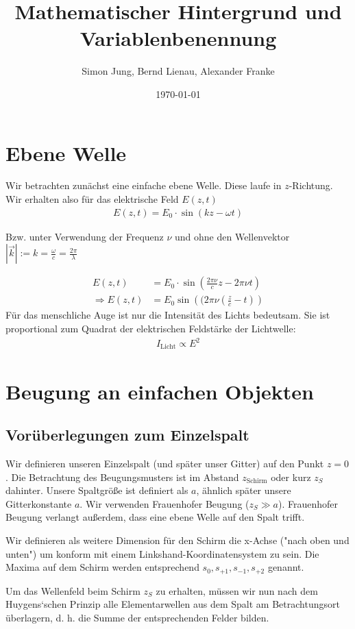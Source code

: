 \documentclass[a4paper]{article}
\title{Mathematischer Hintergrund und Variablenbenennung}
\author{Simon Jung, Bernd Lienau, Alexander Franke}
\date{\today}
\begin{document}
\maketitle
\tableofcontents
\section{Ebene Welle}
Wir betrachten zunächst eine einfache ebene Welle. Diese laufe in $z$-Richtung. Wir erhalten also für das elektrische Feld $E(z,t)$
\begin{align}
E(z,t) = E_0 \cdot \sin(k z-\omega t)
\end{align}

Bzw. unter Verwendung der Frequenz $\nu$ und ohne den Wellenvektor $|\vec{k}| := k = \frac{\omega}{c} = \frac{2\pi}{\lambda}$

\begin{align}
E(z,t) &= E_0 \cdot \sin (\frac{2\pi\nu}{c} z - 2\pi\nu t ) \\
\Rightarrow E(z,t) &= E_0 \sin\left((2\pi\nu \left(\frac{z}{c} - t\right)\right)
\end{align}
 Für das menschliche Auge ist nur die Intensität des Lichts bedeutsam. Sie ist proportional zum Quadrat der
elektrischen Feldstärke der Lichtwelle: 
\begin{align}
I_\text{Licht} \propto E^2 
\end{align}
\section{Beugung an einfachen Objekten}
\subsection{Vorüberlegungen zum Einzelspalt}
Wir definieren unseren Einzelspalt (und später unser Gitter) auf den Punkt $z=0$. Die Betrachtung des Beugungsmusters ist im Abstand $z_\text{Schirm}$ oder kurz $z_S$ dahinter. 
Unsere Spaltgröße ist definiert als $a$, ähnlich später unsere Gitterkonstante $a$. Wir verwenden Frauenhofer Beugung ($z_S \gg a$). Frauenhofer Beugung verlangt außerdem, dass eine ebene Welle auf den Spalt trifft.

Wir definieren als weitere Dimension für den Schirm die x-Achse ("nach oben und unten")  um konform mit einem Linkshand-Koordinatensystem zu sein. Die Maxima auf dem Schirm werden entsprechend $s_0, s_{+1}, s_{-1}, s_{+2}$ genannt.

Um das Wellenfeld beim Schirm $z_S$ zu erhalten, müssen wir nun
nach dem Huygens‘schen Prinzip alle Elementarwellen aus dem Spalt am Betrachtungsort
überlagern, d. h. die Summe der entsprechenden Felder bilden.
\end{document}
